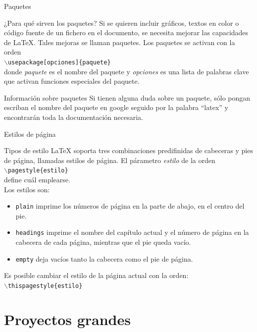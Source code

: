 \documentclass[10pt]{beamer}
\begin{document}
\begin{frame}{Paquetes}
	\begin{block}{¿Para qué sirven los paquetes?}
		Si se quieren incluir gráficos, textos en color o código fuente de un fichero en el documento, se necesita mejorar las capacidades de \LaTeX{}. Tales mejoras se llaman paquetes. Los paquetes se activan con la orden\\
		\texttt{$\backslash$usepackage[opciones]\{paquete\}}\\
donde \emph{paquete} es el nombre del paquete y \emph{opciones} es una lista de palabras clave que activan funciones especiales del paquete. 
	\end{block}
	\begin{alertblock}{Información sobre paquetes}
		Si tienen alguna duda sobre un paquete, sólo pongan escriban el nombre del paquete en google seguido por la palabra “latex” y encontrarán toda la documentación necesaria.
	\end{alertblock}
\end{frame}

\begin{frame}{Estilos de página}
	\begin{block}{Tipos de estilo}
	\LaTeX{} soporta tres combinaciones predifinidas de cabeceras y pies de página, llamadas estilos de página. El párametro \emph{estilo} de la orden \\
	\texttt{$\backslash$pagestyle\{estilo\}} \\
	define cuál emplearse. \\
	Los estilos son:
	\begin{itemize}
	\item \texttt{plain} imprime los números de página en la parte de abajo, en el centro del pie. 
	\item \texttt{headings} imprime el nombre del capítulo actual y el número de página en la cabecera de cada página, mientras que el pie queda vacío.
	\item \texttt{empty} deja vacíos tanto la cabecera como el pie de página.
	\end{itemize}
	Es posible cambiar el estilo de la página actual con la orden: \\
	\texttt{$\backslash$thispagestyle\{estilo\}}
	\end{block}
\end{frame}

\section{Proyectos grandes}
\end{document}
